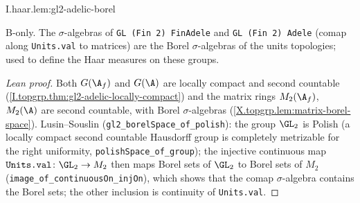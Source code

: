 \begin{lemma}
\bonly
{}
\end{lemma}
\begin{tfformal}{I.haar.lem:gl2-adelic-borel}
\begin{tffidelity}
B-only. The $\sigma$-algebras of \texttt{GL (Fin 2) FinAdele} and \texttt{GL (Fin 2) Adele} (comap along \texttt{Units.val} to matrices) are the Borel $\sigma$-algebras of the units topologies; used to define the Haar measures on these groups.
\end{tffidelity}
\end{tfformal}
\begin{proof}[Lean proof]
Both $G(\A_f)$ and $G(\A)$ are locally compact and second countable (\cref{I.topgrp.thm:gl2-adelic-locally-compact}) and the matrix rings $M_2(\A_f)$, $M_2(\A)$ are second countable, with Borel $\sigma$-algebras (\cref{X.topgrp.lem:matrix-borel-space}). Lusin--Souslin (\texttt{gl2\_borelSpace\_of\_polish}): the group $\GL_2$ is Polish (a locally compact second countable Hausdorff group is completely metrizable for the right uniformity, \texttt{polishSpace\_of\_group}); the injective continuous map $\texttt{Units.val}\colon\GL_2\to M_2$ then maps Borel sets of $\GL_2$ to Borel sets of $M_2$ (\texttt{image\_of\_continuousOn\_injOn}), which shows that the comap $\sigma$-algebra contains the Borel sets; the other inclusion is continuity of \texttt{Units.val}.
\end{proof}

